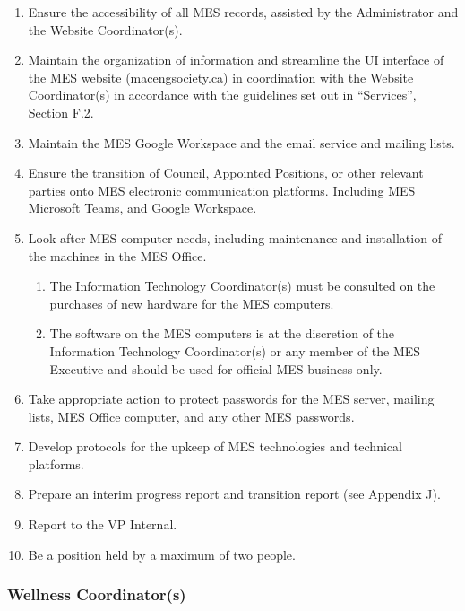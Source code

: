 \begin{enumerate}
 \item
  Ensure the accessibility of all MES records, assisted by the
  Administrator and the Website Coordinator(s).
 \item
  Maintain the organization of information and streamline the UI
  interface of the MES website (macengsociety.ca) in coordination with
  the Website Coordinator(s) in accordance with the guidelines set out
  in ``Services'', Section F.2.
 \item
  Maintain the MES Google Workspace and the email service and mailing
  lists.
 \item
  Ensure the transition of Council, Appointed Positions, or other
  relevant parties onto MES electronic communication platforms.
  Including MES Microsoft Teams, and Google Workspace.
 \item
  Look after MES computer needs, including maintenance and installation
  of the machines in the MES Office.

  \begin{enumerate}
   \item
    The Information Technology Coordinator(s) must be consulted on the
    purchases of new hardware for the MES computers.
   \item
    The software on the MES computers is at the discretion of the
    Information Technology Coordinator(s) or any member of the MES
    Executive and should be used for official MES business only.
  \end{enumerate}
 \item
  Take appropriate action to protect passwords for the MES server,
  mailing lists, MES Office computer, and any other MES passwords.
 \item
  Develop protocols for the upkeep of MES technologies and technical
  platforms.
 \item
  Prepare an interim progress report and transition report (see Appendix
  J).
 \item
  Report to the VP Internal.
 \item
  Be a position held by a maximum of two people.

\end{enumerate}

\hypertarget{wellness-coordinators}{%
 \subsubsection{\texorpdfstring{Wellness Coordinator(s)
  }{Wellness Coordinator(s) }}
 \label{wellness-coordinators}}

